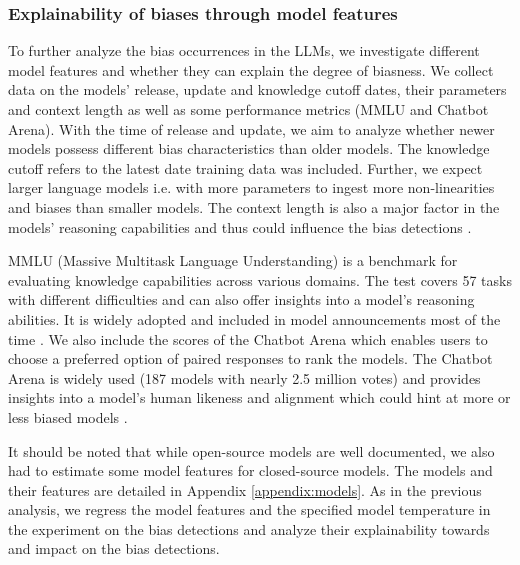 \subsubsection{Explainability of biases through model features}
\par To further analyze the bias occurrences in the LLMs, we investigate different model features and whether they can explain the degree of biasness. We collect data on the models' release, update and knowledge cutoff dates, their parameters and context length as well as some performance metrics (MMLU and Chatbot Arena). With the time of release and update, we aim to analyze whether newer models possess different bias characteristics than older models. The knowledge cutoff refers to the latest date training data was included. Further, we expect larger language models i.e. with more parameters to ingest more non-linearities and biases than smaller models. The context length is also a major
 factor in the models' reasoning capabilities and thus could influence the bias detections \parencite{naveed2023comprehensive, zhao2023survey}.

\par MMLU (Massive Multitask Language Understanding) is a benchmark for evaluating knowledge capabilities across various domains. The test covers 57 tasks with different difficulties and can also offer insights into a model's reasoning abilities. It is widely adopted and included in model announcements most of the time \parencite{hendrycks2020measuring}. We also include the scores of the Chatbot Arena which enables users to choose a preferred option of paired responses to rank the models. The Chatbot Arena is widely used (187 models with nearly 2.5 million votes) and provides insights into a model's human likeness and alignment which could hint at more or less biased models \parencite{chiang2024chatbot, huggingface2024chatbotarena}.

\par It should be noted that while open-source models are well documented, we also had to estimate some model features for closed-source models. The models and their features are detailed in Appendix \ref{appendix:models}. As in the previous analysis, we regress the model features and the specified model temperature in the experiment on the bias detections and analyze their explainability towards and impact on the bias detections.